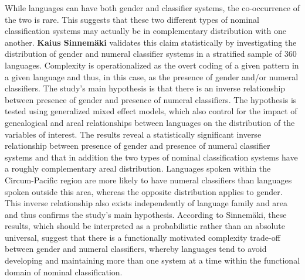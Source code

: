 \documentclass[output=collectionpaper]{langsci/langscibook}
\begin{document}
While languages can have both gender and classifier systems, the co-occurrence of the two is rare. This suggests that these two different types of nominal classification systems may actually be in complementary distribution with one another. \textbf{Kaius Sinnemäki} validates this claim statistically by investigating the distribution of gender and numeral classifier systems in a stratified sample of 360 languages. Complexity is operationalized as the overt coding of a given pattern in a given language and thus, in this case, as the presence of gender and/or numeral classifiers. The study’s main hypothesis is that there is an inverse relationship between presence of gender and presence of numeral classifiers. The hypothesis is tested using generalized mixed effect models, which also control for the impact of genealogical and areal relationships between languages on the distribution of the variables of interest. The results reveal a statistically significant inverse relationship between presence of gender and presence of numeral classifier systems and that in addition the two types of nominal classification systems have a roughly complementary areal distribution. Languages spoken within the Circum-Pacific region are more likely to have numeral classifiers than languages spoken outside this area, whereas the opposite distribution applies to gender. This inverse relationship also exists independently of language family and area and thus confirms the study’s main hypothesis. According to Sinnemäki, these results, which should be interpreted as a probabilistic rather than an absolute universal, suggest that there is a functionally motivated complexity trade-off between gender and numeral classifiers, whereby languages tend to avoid developing and maintaining more than one system at a time within the functional domain of nominal classification.
\end{document}
